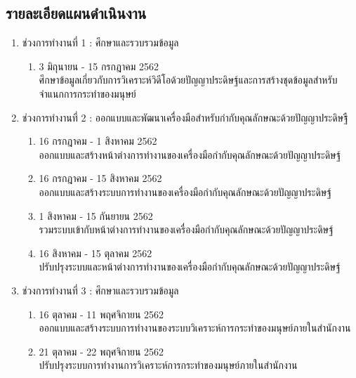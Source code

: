 \subsection*{รายละเอียดแผนดำเนินงาน}
\begin{enumerate}\setlength\itemsep{-0.25em}
	\item ช่วงการทำงานที่ 1 : ศึกษาและรวบรวมข้อมูล
		\begin{enumerate}
			\item 3 มิถุนายน - 15 กรกฎาคม 2562\\ศึกษาข้อมูลเกี่ยวกับการวิเคราะห์วิดีโอด้วยปัญญาประดิษฐ์และการสร้างชุดข้อมูลสำหรับจำแนกการกระทำของมนุษย์		
		\end{enumerate}	
	\item ช่วงการทำงานที่ 2 : ออกแบบและพัฒนาเครื่องมือสำหรับกำกับคุณลักษณะด้วยปัญญาประดิษฐื
		\begin{enumerate}
			\item 16 กรกฎาคม - 1 สิงหาคม 2562\\ออกแบบและสร้างหน้าต่างการทำงานของเครื่องมือกำกับคุณลักษณะด้วยปัญญาประดิษฐ์
			\item 16 กรกฎาคม - 15 สิงหาคม 2562\\ออกแบบและสร้างระบบการทำงานของเครื่องมือกำกับคุณลักษณะด้วยปัญญาประดิษฐ์
			\item 1 สิงหาคม - 15 กันยายน 2562\\รวมระบบเข้ากับหน้าต่างการทำงานของเครื่องมือกำกับคุณลักษณะด้วยปัญญาประดิษฐ์
			\item 16 สิงหาคม - 15 ตุลาคม 2562\\ปรับปรุงระบบและหน้าต่างการทำงานของเครื่องมือกำกับคุณลักษณะด้วยปัญญาประดิษฐ์
		\end{enumerate}
	\item ช่วงการทำงานที่ 3 : ศึกษาและรวบรวมข้อมูล
		\begin{enumerate}
			\item 16 ตุลาคม - 11 พฤศจิกายน 2562\\ออกแบบและสร้างระบบการทำงานของระบบวิเคราะห์การกระทำของมนุษย์ภายในสำนักงาน		
			\item 21 ตุลาคม - 22 พฤศจิกายน 2562\\ปรับปรุงระบบการทำงานการวิเคราะห์การกระทำของมนุษย์ภายในสำนักงาน		
		\end{enumerate}	
\end{enumerate}
\clearpage